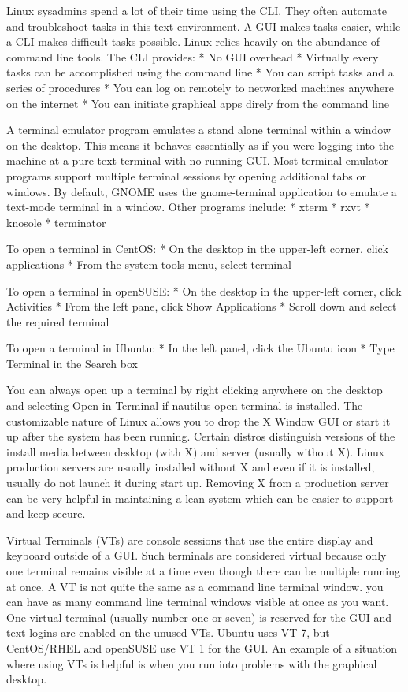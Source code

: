 Linux sysadmins spend a lot of their time using the CLI. They often
automate and troubleshoot tasks in this text environment. A GUI makes
tasks easier, while a CLI makes difficult tasks possible. Linux relies
heavily on the abundance of command line tools. The CLI provides: * No
GUI overhead * Virtually every tasks can be accomplished using the
command line * You can script tasks and a series of procedures * You can
log on remotely to networked machines anywhere on the internet * You can
initiate graphical apps direly from the command line

A terminal emulator program emulates a stand alone terminal within a
window on the desktop. This means it behaves essentially as if you were
logging into the machine at a pure text terminal with no running GUI.
Most terminal emulator programs support multiple terminal sessions by
opening additional tabs or windows. By default, GNOME uses the
gnome-terminal application to emulate a text-mode terminal in a window.
Other programs include: * xterm * rxvt * knosole * terminator

To open a terminal in CentOS: * On the desktop in the upper-left corner,
click applications * From the system tools menu, select terminal

To open a terminal in openSUSE: * On the desktop in the upper-left
corner, click Activities * From the left pane, click Show Applications *
Scroll down and select the required terminal

To open a terminal in Ubuntu: * In the left panel, click the Ubuntu icon
* Type Terminal in the Search box

You can always open up a terminal by right clicking anywhere on the
desktop and selecting Open in Terminal if nautilus-open-terminal is
installed. The customizable nature of Linux allows you to drop the X
Window GUI or start it up after the system has been running. Certain
distros distinguish versions of the install media between desktop (with
X) and server (usually without X). Linux production servers are usually
installed without X and even if it is installed, usually do not launch
it during start up. Removing X from a production server can be very
helpful in maintaining a lean system which can be easier to support and
keep secure.

Virtual Terminals (VTs) are console sessions that use the entire display
and keyboard outside of a GUI. Such terminals are considered virtual
because only one terminal remains visible at a time even though there
can be multiple running at once. A VT is not quite the same as a command
line terminal window. you can have as many command line terminal windows
visible at once as you want. One virtual terminal (usually number one or
seven) is reserved for the GUI and text logins are enabled on the unused
VTs. Ubuntu uses VT 7, but CentOS/RHEL and openSUSE use VT 1 for the
GUI. An example of a situation where using VTs is helpful is when you
run into problems with the graphical desktop.

